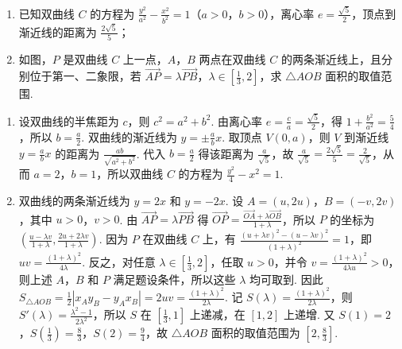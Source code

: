 \begin{problem}
\begin{enumerate}
\item 已知双曲线 \(C\) 的方程为 \( \frac{y^{2}}{a^{2}} - \frac{x^{2}}{b^{2}} = 1 \)（\(a > 0\)，\(b > 0\)），离心率 \( e = \frac{\sqrt{5}}{2} \)，顶点到渐近线的距离为 \( \frac{2\sqrt{5}}{5} \)；
\item 如图，\(P\) 是双曲线 \(C\) 上一点，\(A\)，\(B\) 两点在双曲线 \(C\) 的两条渐近线上，且分别位于第一、二象限，若 \(\overrightarrow{AP}=\lambda\overrightarrow{PB}\)，\(\lambda\in\left[\frac{1}{3},2\right]\)，求 \(\triangle AOB\) 面积的取值范围.
\end{enumerate}

\end{problem}

\begin{solution}
\begin{enumerate}
\item 设双曲线的半焦距为 \(c\)，则 \(c^{2}=a^{2}+b^{2}\). 由离心率 \(e=\frac{c}{a}=\frac{\sqrt{5}}{2}\)，得 \(1+\frac{b^{2}}{a^{2}}=\frac{5}{4}\)，所以 \(b=\frac{a}{2}\). 双曲线的渐近线为 \(y=\pm\frac{a}{b}x\). 取顶点 \(V(0,a)\)，则 \(V\) 到渐近线 \(y=\frac{a}{b}x\) 的距离为 \(\frac{ab}{\sqrt{a^{2}+b^{2}}}\). 代入 \(b=\frac{a}{2}\) 得该距离为 \(\frac{a}{\sqrt{5}}\)，故 \(\frac{a}{\sqrt{5}}=\frac{2\sqrt{5}}{5}=\frac{2}{\sqrt{5}}\)，从而 \(a=2\)，\(b=1\)，所以双曲线 \(C\) 的方程为 \(\frac{y^{2}}{4}-x^{2}=1\).
\item 双曲线的两条渐近线为 \(y=2x\) 和 \(y=-2x\). 设 \(A=(u,2u)\)，\(B=(-v,2v)\)，其中 \(u>0\)，\(v>0\). 由 \(\overrightarrow{AP}=\lambda\overrightarrow{PB}\) 得 \(\overrightarrow{OP}=\frac{\overrightarrow{OA}+\lambda\overrightarrow{OB}}{1+\lambda}\)，所以 \(P\) 的坐标为 \(\left(\frac{u-\lambda v}{1+\lambda},\frac{2u+2\lambda v}{1+\lambda}\right)\). 因为 \(P\) 在双曲线 \(C\) 上，有 \(\frac{(u+\lambda v)^{2}-(u-\lambda v)^{2}}{(1+\lambda)^{2}}=1\)，即 \(uv=\frac{(1+\lambda)^{2}}{4\lambda}\). 反之，对任意 \(\lambda\in\left[\frac{1}{3},2\right]\)，任取 \(u>0\)，并令 \(v=\frac{(1+\lambda)^{2}}{4\lambda u}>0\)，则上述 \(A\)，\(B\) 和 \(P\) 满足题设条件，所以这些 \(\lambda\) 均可取到. 因此 \(S_{\triangle AOB}=\frac{1}{2}|x_{A}y_{B}-y_{A}x_{B}|=2uv=\frac{(1+\lambda)^{2}}{2\lambda}\). 记 \(S(\lambda)=\frac{(1+\lambda)^{2}}{2\lambda}\)，则 \(S'(\lambda)=\frac{\lambda^{2}-1}{2\lambda^{2}}\)，所以 \(S\) 在 \(\left[\frac{1}{3},1\right]\) 上递减，在 \([1,2]\) 上递增. 又 \(S(1)=2\)，\(S\left(\frac{1}{3}\right)=\frac{8}{3}\)，\(S(2)=\frac{9}{4}\)，故 \(\triangle AOB\) 面积的取值范围为 \(\left[2,\frac{8}{3}\right]\).
\end{enumerate}
\end{solution}
